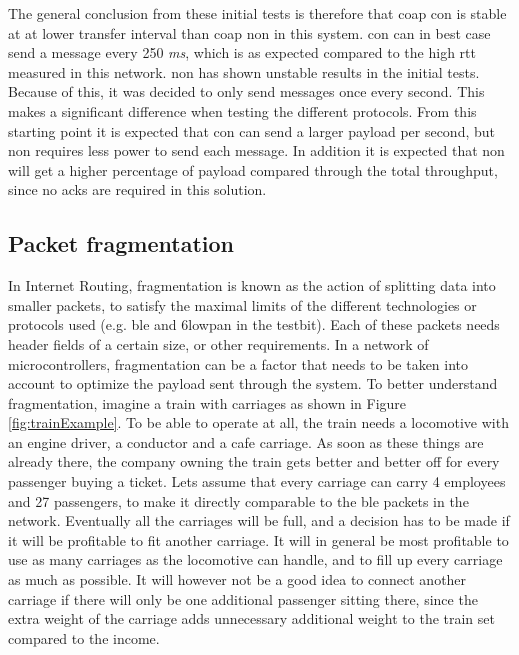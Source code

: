 \noindent The general conclusion from these initial tests is therefore that \gls{coap} \gls{con} is stable at at lower transfer interval than \gls{coap} \gls{non} in this system. \gls{con} can in best case send a message every 250 \textit{ms}, which is as expected compared to the high \gls{rtt} measured in this network. \gls{non} has shown unstable results in the initial tests. Because of this, it was decided to only send messages once every second. This makes a significant difference when testing the different protocols. From this starting point it is expected that \gls{con} can send a larger \gls{payload} per second, but \gls{non} requires less power to send each message. In addition it is expected that \gls{non} will get a higher percentage of \gls{payload} compared through the total throughput, since no \glspl{ack} are required in this solution. 


\subsection{Packet fragmentation}

\noindent In Internet Routing, fragmentation is known as the action of splitting data into smaller \glspl{packet}, to satisfy the maximal limits of the different technologies or protocols used (e.g. \gls{ble} and \gls{6lowpan} in the testbit). Each of these packets needs header fields of a certain size, or other requirements. In a network of \glspl{microcontroller}, fragmentation can be a factor that needs to be taken into account to optimize the \gls{payload} sent through the system. To better understand fragmentation, imagine a train with carriages as shown in Figure \ref{fig:trainExample}. To be able to operate at all, the train needs a locomotive with an engine driver, a conductor and a cafe carriage. As soon as these things are already there, the company owning the train gets better and better off for every passenger buying a ticket. Lets assume that every carriage can carry 4 employees and 27 passengers, to make it directly comparable to the \gls{ble} packets in the network. Eventually all the carriages will be full, and a decision has to be made if it will be profitable to fit another carriage. It will in general be most profitable to use as many carriages as the locomotive can handle, and to fill up every carriage as much as possible. It will however not be a good idea to connect another carriage if there will only be one additional passenger sitting there, since the extra weight of the carriage adds unnecessary additional weight to the train set compared to the income. 

